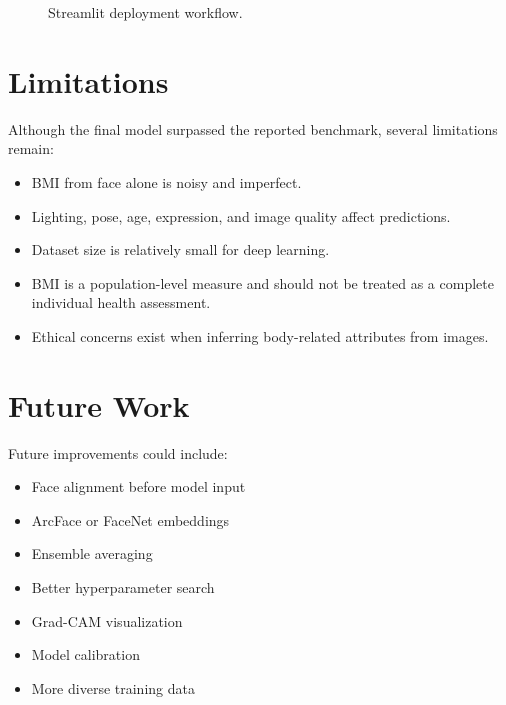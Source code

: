\documentclass[11pt]{article}
\begin{document}
\begin{figure}[H]
\centering
{}
\caption{Streamlit deployment workflow.}
\end{figure}

\section{Limitations}

Although the final model surpassed the reported benchmark, several limitations remain:

\begin{itemize}
    \item BMI from face alone is noisy and imperfect.
    \item Lighting, pose, age, expression, and image quality affect predictions.
    \item Dataset size is relatively small for deep learning.
    \item BMI is a population-level measure and should not be treated as a complete individual health assessment.
    \item Ethical concerns exist when inferring body-related attributes from images.
\end{itemize}

\section{Future Work}

Future improvements could include:

\begin{itemize}
    \item Face alignment before model input
    \item ArcFace or FaceNet embeddings
    \item Ensemble averaging
    \item Better hyperparameter search
    \item Grad-CAM visualization
    \item Model calibration
    \item More diverse training data
\end{itemize}
\end{document}
